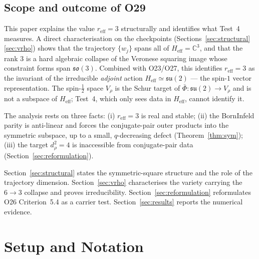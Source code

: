 \documentclass[12pt,a4paper]{article}
\theoremstyle{remark}
\newcommand{\su}{\mathfrak{su}}
\newcommand{\Heff}{H_{\mathrm{eff}}}
\newcommand{\Vrho}{V_{\rho}}
\newcommand{\reff}{r_{\mathrm{eff}}}
\begin{document}
    \subsection{Scope and outcome of O29}
      \label{sec:scope}

      This paper explains the value $\reff = 3$ structurally and identifies what Test~4 measures.
      A direct characterisation on the checkpoints (Sections~\ref{sec:structural}\textendash{}\ref{sec:vrho}) shows
      that the trajectory $\{w_j\}$ spans all of $\Heff = \mathbb{C}^3$, and that the rank $3$ is a hard algebraic
      collapse of the Veronese squaring image whose constraint forms span $\mathfrak{so}(3)$.
      Combined with O23/O27, this identifies $\reff = 3$ as the invariant of the irreducible \emph{adjoint} action
      $\Heff \simeq \su(2)$ --- the spin-$1$ vector representation.
      The spin-$\tfrac{1}{2}$ space $\Vrho$ is the Schur target of $\bar\Phi : \su(2) \to \Vrho$ and is not a subspace
      of $\Heff$; Test~4, which only sees data in $\Heff$, cannot identify it.

      The analysis rests on three facts: (i) $\reff = 3$ is real and stable; (ii) the Born\textendash{}Infeld parity
      is anti-linear and forces the conjugate-pair outer products into the symmetric subspace, up to a small,
      $q$-decreasing defect (Theorem~\ref{thm:sym}); (iii) the target $d_\rho^2 = 4$ is inaccessible from
      conjugate-pair data (Section~\ref{sec:reformulation}).

      Section~\ref{sec:structural} states the symmetric-square structure and the role of the trajectory dimension.
      Section~\ref{sec:vrho} characterises the variety carrying the $6 \to 3$ collapse and proves irreducibility.
      Section~\ref{sec:reformulation} reformulates O26 Criterion~5.4 as a carrier test.
      Section~\ref{sec:results} reports the numerical evidence.

  \section{Setup and Notation}
    \label{sec:setup}
\end{document}
